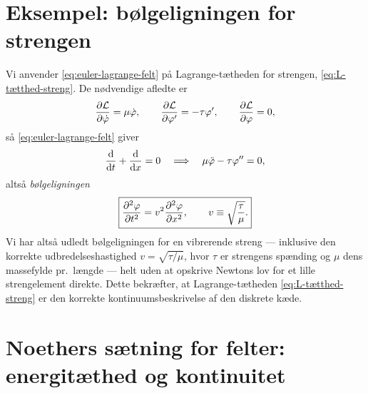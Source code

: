 \section{Eksempel: bølgeligningen for strengen}

\begin{eksempel}
Vi anvender \eqref{eq:euler-lagrange-felt} på Lagrange-tætheden for
strengen, \eqref{eq:L-tætthed-streng}. De nødvendige afledte er
\begin{equation}
  \pdv{\mathcal{L}}{\dot\varphi} = \mu\dot\varphi, \qquad
  \pdv{\mathcal{L}}{\varphi'} = -\tau\varphi', \qquad
  \pdv{\mathcal{L}}{\varphi} = 0,
\end{equation}
så \eqref{eq:euler-lagrange-felt} giver
\begin{equation}
  \dv{}{t}(\mu\dot\varphi) + \dv{}{x}(-\tau\varphi') = 0
  \quad\Longrightarrow\quad
  \mu\ddot\varphi - \tau\varphi'' = 0,
\end{equation}
altså \emph{bølgeligningen}
\begin{equation}
  \boxed{\pdv[2]{\varphi}{t} = v^2\pdv[2]{\varphi}{x}, \qquad v\equiv\sqrt{\frac{\tau}{\mu}}.}
  \label{eq:boelgeligning}
\end{equation}
Vi har altså udledt bølgeligningen for en vibrerende streng —
inklusive den korrekte udbredelseshastighed $v=\sqrt{\tau/\mu}$, hvor
$\tau$ er strengens spænding og $\mu$ dens massefylde pr.\ længde —
helt uden at opskrive Newtons lov for et lille strengelement direkte.
Dette bekræfter, at Lagrange-tætheden \eqref{eq:L-tætthed-streng} er
den korrekte kontinuumsbeskrivelse af den diskrete kæde.
\end{eksempel}

\section{Noethers sætning for felter: energitæthed og kontinuitet}

